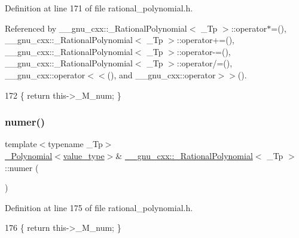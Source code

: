 Definition at line 171 of file rational\+\_\+polynomial.\+h.



Referenced by \+\_\+\+\_\+gnu\+\_\+cxx\+::\+\_\+\+Rational\+Polynomial$<$ \+\_\+\+Tp $>$\+::operator$\ast$=(), \+\_\+\+\_\+gnu\+\_\+cxx\+::\+\_\+\+Rational\+Polynomial$<$ \+\_\+\+Tp $>$\+::operator+=(), \+\_\+\+\_\+gnu\+\_\+cxx\+::\+\_\+\+Rational\+Polynomial$<$ \+\_\+\+Tp $>$\+::operator-\/=(), \+\_\+\+\_\+gnu\+\_\+cxx\+::\+\_\+\+Rational\+Polynomial$<$ \+\_\+\+Tp $>$\+::operator/=(), \+\_\+\+\_\+gnu\+\_\+cxx\+::operator$<$$<$(), and \+\_\+\+\_\+gnu\+\_\+cxx\+::operator$>$$>$().


\begin{DoxyCode}
172       \{ \textcolor{keywordflow}{return} this->\_M\_num; \}
\end{DoxyCode}
\mbox{\label{class____gnu__cxx_1_1__RationalPolynomial_ab672b7b5adc77e5937611ea20c9e68b0}} 
\subsubsection{\texorpdfstring{numer()}{numer()}\hspace{0.1cm}{\footnotesize\ttfamily [2/2]}}
{\footnotesize\ttfamily template$<$typename \+\_\+\+Tp$>$ \\
\hyperlink{class____gnu__cxx_1_1__Polynomial}{\+\_\+\+Polynomial}$<$\hyperlink{class____gnu__cxx_1_1__RationalPolynomial_adeec7f1bec03111031599f337848ee8b}{value\+\_\+type}$>$\& \hyperlink{class____gnu__cxx_1_1__RationalPolynomial}{\+\_\+\+\_\+gnu\+\_\+cxx\+::\+\_\+\+Rational\+Polynomial}$<$ \+\_\+\+Tp $>$\+::numer (\begin{DoxyParamCaption}{ }\end{DoxyParamCaption})\hspace{0.3cm}{\ttfamily [inline]}}



Definition at line 175 of file rational\+\_\+polynomial.\+h.


\begin{DoxyCode}
176       \{ \textcolor{keywordflow}{return} this->\_M\_num; \}
\end{DoxyCode}
\mbox{\label{class____gnu__cxx_1_1__RationalPolynomial_a964bc37a8932003c8ecd45da84512b2d}} 
